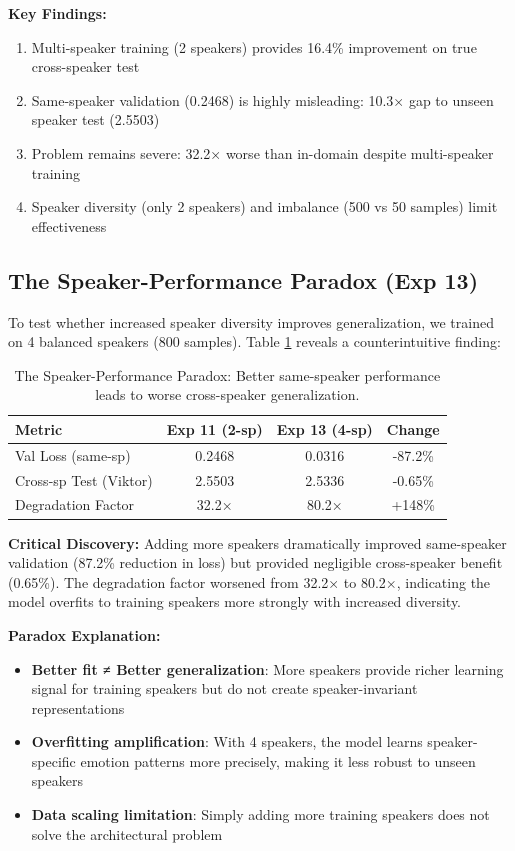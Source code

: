 \textbf{Key Findings:}
\begin{enumerate}
    \item Multi-speaker training (2 speakers) provides 16.4\% improvement on true cross-speaker test
    \item Same-speaker validation (0.2468) is highly misleading: 10.3× gap to unseen speaker test (2.5503)
    \item Problem remains severe: 32.2× worse than in-domain despite multi-speaker training
    \item Speaker diversity (only 2 speakers) and imbalance (500 vs 50 samples) limit effectiveness
\end{enumerate}

\subsection{The Speaker-Performance Paradox (Exp 13)}

To test whether increased speaker diversity improves generalization, we trained on 4 balanced speakers (800 samples). Table \ref{tab:speaker_paradox} reveals a counterintuitive finding:

\begin{table}[h]
\centering
\caption{The Speaker-Performance Paradox: Better same-speaker performance leads to worse cross-speaker generalization.}
\label{tab:speaker_paradox}
\begin{tabular}{lccc}
\toprule
\textbf{Metric} & \textbf{Exp 11 (2-sp)} & \textbf{Exp 13 (4-sp)} & \textbf{Change} \\
\midrule
Val Loss (same-sp) & 0.2468 & 0.0316 & -87.2\% \\
Cross-sp Test (Viktor) & 2.5503 & 2.5336 & -0.65\% \\
Degradation Factor & 32.2× & 80.2× & +148\% \\
\bottomrule
\end{tabular}
\end{table}

\textbf{Critical Discovery:} Adding more speakers dramatically improved same-speaker validation (87.2\% reduction in loss) but provided negligible cross-speaker benefit (0.65\%). The degradation factor worsened from 32.2× to 80.2×, indicating the model overfits to training speakers more strongly with increased diversity.

\textbf{Paradox Explanation:}
\begin{itemize}
    \item \textbf{Better fit ≠ Better generalization}: More speakers provide richer learning signal for training speakers but do not create speaker-invariant representations
    \item \textbf{Overfitting amplification}: With 4 speakers, the model learns speaker-specific emotion patterns more precisely, making it less robust to unseen speakers
    \item \textbf{Data scaling limitation}: Simply adding more training speakers does not solve the architectural problem
\end{itemize}

